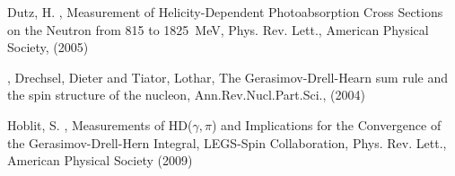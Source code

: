         Dutz, H. \etal, Measurement of Helicity-Dependent Photoabsorption Cross Sections on the Neutron from 815 to 1825~MeV, 
        Phys. Rev. Lett., American Physical Society, (2005)
 
,
      Drechsel, Dieter and Tiator, Lothar,
      The Gerasimov-Drell-Hearn sum rule and the spin structure of the nucleon,
      Ann.Rev.Nucl.Part.Sci., (2004)


        Hoblit, S. \etal, %
        Measurements of HD($\gamma,\pi$) and Implications for the Convergence of the Gerasimov-Drell-Hern Integral,
        LEGS-Spin Collaboration, Phys. Rev. Lett., American Physical Society (2009)


